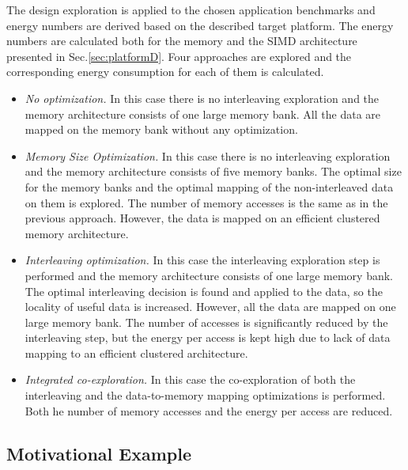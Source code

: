 The design exploration is applied to the chosen application benchmarks and energy numbers are derived based on the described target platform.
The energy numbers are calculated both for the memory and the SIMD architecture presented in Sec.\ref{sec:platformD}.
Four approaches are explored and the corresponding energy consumption for each of them is calculated.

\begin{itemize}
\item \textit{No optimization.} 
In this case there is no interleaving exploration and the memory architecture consists of one large memory bank. All the data are mapped on the memory bank without any optimization. 
\item \textit{Memory Size Optimization.} 
In this case there is no interleaving exploration and the memory architecture consists of five memory banks.
The optimal size for the memory banks and the optimal mapping of the non-interleaved data on them is explored. 
The number of memory accesses is the same as in the previous approach.
However, the data is mapped on an efficient clustered memory architecture.
\item \textit{Interleaving optimization.} 
In this case the  interleaving exploration step is performed and the memory architecture consists of one large memory bank.
The optimal interleaving decision is found and applied to the data, so the locality of useful data is increased.
However, all the data are mapped on one large memory bank.
The number of accesses is significantly reduced by the interleaving step, but the energy per access is kept high due to lack of data mapping to an efficient clustered architecture.
\item \textit{Integrated co-exploration.} 
In this case the co-exploration of both the interleaving and the data-to-memory mapping optimizations is performed.
Both he number of memory accesses and the energy per access are reduced.
\end{itemize}

\subsection{Motivational Example}

